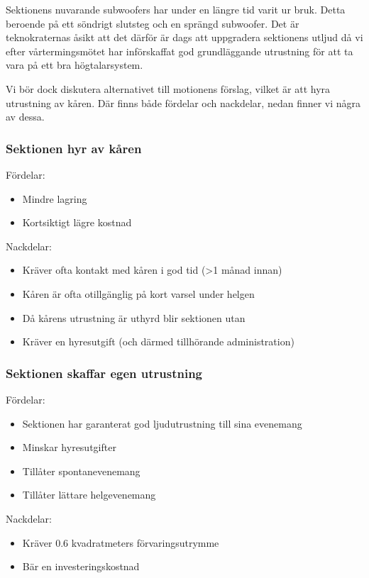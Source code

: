 \documentclass[../_main/handlingar.tex]{subfiles}
\begin{document}
    Sektionens nuvarande subwoofers har under en längre tid varit ur bruk. Detta beroende på ett söndrigt slutsteg och en sprängd subwoofer. Det är teknokraternas åsikt att det därför är dags att uppgradera sektionens utljud då vi efter vårtermingsmötet har införskaffat god grundläggande utrustning för att ta vara på ett bra högtalarsystem. 
    
    Vi bör dock diskutera alternativet till motionens förslag, vilket är att hyra utrustning av kåren. Där finns både fördelar och nackdelar, nedan finner vi några av dessa. 
   
   \subsubsection*{Sektionen hyr av kåren}
   Fördelar: 
    \begin{itemize}
        \item Mindre lagring
        \item Kortsiktigt lägre kostnad
    \end{itemize}

    Nackdelar: 
    \begin{itemize}
        \item Kräver ofta kontakt med kåren i god tid (>1 månad innan)
        \item Kåren är ofta otillgänglig på kort varsel under helgen
        \item Då kårens utrustning är uthyrd blir sektionen utan
        \item Kräver en hyresutgift (och därmed tillhörande administration)
    \end{itemize}
   
   \subsubsection*{Sektionen skaffar egen utrustning}
    Fördelar: 
    \begin{itemize}
        \item Sektionen har garanterat god ljudutrustning till sina evenemang
        \item Minskar hyresutgifter
        \item Tillåter spontanevenemang
        \item Tillåter lättare helgevenemang
    \end{itemize}

    Nackdelar: 
    \begin{itemize}
        \item Kräver 0.6 kvadratmeters förvaringsutrymme
        \item Bär en investeringskostnad
    \end{itemize}
\end{document}
